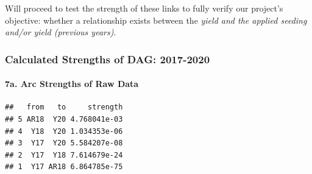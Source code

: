 \documentclass[
]{article}
\newenvironment{Shaded}{\begin{snugshade}}{\end{snugshade}}
\newcommand{\AttributeTok}[1]{\textcolor[rgb]{0.13,0.29,0.53}{#1}}
\newcommand{\CommentTok}[1]{\textcolor[rgb]{0.56,0.35,0.01}{\textit{#1}}}
\newcommand{\FunctionTok}[1]{\textcolor[rgb]{0.13,0.29,0.53}{\textbf{#1}}}
\newcommand{\NormalTok}[1]{#1}
\newcommand{\OtherTok}[1]{\textcolor[rgb]{0.56,0.35,0.01}{#1}}
\newcommand{\SpecialCharTok}[1]{\textcolor[rgb]{0.81,0.36,0.00}{\textbf{#1}}}
\newcommand{\StringTok}[1]{\textcolor[rgb]{0.31,0.60,0.02}{#1}}
\begin{document}
Will proceed to test the strength of these links to fully verify our
project's objective: whether a relationship exists between the
\emph{yield and the applied seeding and/or yield (previous years)}.

\subsubsection{Calculated Strengths of DAG:
2017-2020}\label{calculated-strengths-of-dag-2017-2020}

\paragraph{7a. Arc Strengths of Raw
Data}\label{a.-arc-strengths-of-raw-data}

\begin{Shaded}
\end{Shaded}

\begin{verbatim}
##   from   to     strength
## 5 AR18  Y20 4.768041e-03
## 4  Y18  Y20 1.034353e-06
## 3  Y17  Y20 5.584207e-08
## 2  Y17  Y18 7.614679e-24
## 1  Y17 AR18 6.864785e-75
\end{verbatim}
\end{document}
